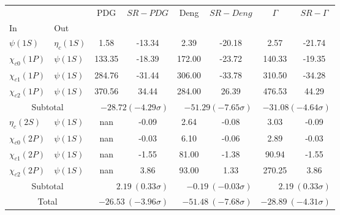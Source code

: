 \begin{tabular}{|l|l|c|c|c|c|c|c|}%
\hline%
&&PDG&$SR-PDG$&Deng&$SR-Deng$&$\Gamma$&$SR-\Gamma$\\%
In&Out&&&&&&\\%
\hline%
$\psi(1S)$&$\eta_{c}(1S)$&1.58&-13.34&2.39&-20.18&2.57&-21.74\\%
$\chi_{c0}(1P)$&$\psi(1S)$&133.35&-18.39&172.00&-23.72&140.33&-19.35\\%
$\chi_{c1}(1P)$&$\psi(1S)$&284.76&-31.44&306.00&-33.78&310.50&-34.28\\%
$\chi_{c2}(1P)$&$\psi(1S)$&370.56&34.44&284.00&26.39&476.53&44.29\\%
\hline%
\hline%
\multicolumn{2}{|c|}{Subtotal}&\multicolumn{2}{|r|}{$-28.72 (-4.29\sigma)$}&\multicolumn{2}{|r|}{$-51.29 (-7.65\sigma)$}&\multicolumn{2}{|r|}{$-31.08 (-4.64\sigma)$}\\%
\hline%
\hline%
$\eta_{c}(2S)$&$\psi(1S)$&nan&-0.09&2.64&-0.08&3.03&-0.09\\%
$\chi_{c0}(2P)$&$\psi(1S)$&nan&-0.03&6.10&-0.06&2.89&-0.03\\%
$\chi_{c1}(2P)$&$\psi(1S)$&nan&-1.55&81.00&-1.38&90.94&-1.55\\%
$\chi_{c2}(2P)$&$\psi(1S)$&nan&3.86&93.00&1.33&270.25&3.86\\%
\hline%
\hline%
\multicolumn{2}{|c|}{Subtotal}&\multicolumn{2}{|r|}{$2.19~(0.33\sigma)$}&\multicolumn{2}{|r|}{$-0.19~(-0.03\sigma)$}&\multicolumn{2}{|r|}{$2.19~(0.33\sigma)$}\\%
\hline%
\hline%
\multicolumn{2}{|c|}{Total}&\multicolumn{2}{|r|}{$-26.53~(-3.96\sigma)$}&\multicolumn{2}{|r|}{$-51.48~(-7.68\sigma)$}&\multicolumn{2}{|r|}{$-28.89~(-4.31\sigma)$}\\%
\hline%
\end{tabular}